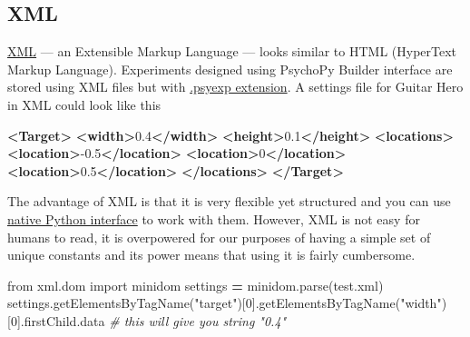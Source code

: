 \documentclass[
]{book}
\newenvironment{Shaded}{\begin{snugshade}}{\end{snugshade}}
\newcommand{\CommentTok}[1]{\textcolor[rgb]{0.56,0.35,0.01}{\textit{#1}}}
\newcommand{\DecValTok}[1]{\textcolor[rgb]{0.00,0.00,0.81}{#1}}
\newcommand{\ImportTok}[1]{#1}
\newcommand{\KeywordTok}[1]{\textcolor[rgb]{0.13,0.29,0.53}{\textbf{#1}}}
\newcommand{\NormalTok}[1]{#1}
\newcommand{\OperatorTok}[1]{\textcolor[rgb]{0.81,0.36,0.00}{\textbf{#1}}}
\newcommand{\StringTok}[1]{\textcolor[rgb]{0.31,0.60,0.02}{#1}}
\begin{document}
\hypertarget{xml}{%
\subsection{XML}\label{xml}}

\href{https://en.wikipedia.org/wiki/XML}{XML} --- an Extensible Markup Language --- looks similar to HTML (HyperText Markup Language). Experiments designed using PsychoPy Builder interface are stored using XML files but with \href{https://www.psychopy.org/psyexp.html}{.psyexp extension}. A settings file for Guitar Hero in XML could look like this

\begin{Shaded}
\begin{Highlighting}[]
\KeywordTok{\textless{}Target\textgreater{}}
  \KeywordTok{\textless{}width\textgreater{}}\NormalTok{0.4}\KeywordTok{\textless{}/width\textgreater{}}
  \KeywordTok{\textless{}height\textgreater{}}\NormalTok{0.1}\KeywordTok{\textless{}/height\textgreater{}}
  \KeywordTok{\textless{}locations\textgreater{}}
    \KeywordTok{\textless{}location\textgreater{}}\NormalTok{{-}0.5}\KeywordTok{\textless{}/location\textgreater{}}
    \KeywordTok{\textless{}location\textgreater{}}\NormalTok{0}\KeywordTok{\textless{}/location\textgreater{}}
    \KeywordTok{\textless{}location\textgreater{}}\NormalTok{0.5}\KeywordTok{\textless{}/location\textgreater{}}
  \KeywordTok{\textless{}/locations\textgreater{}}
\KeywordTok{\textless{}/Target\textgreater{}}
\end{Highlighting}
\end{Shaded}

The advantage of XML is that it is very flexible yet structured and you can use \href{https://docs.python.org/3/library/xml.html}{native Python interface} to work with them. However, XML is not easy for humans to read, it is overpowered for our purposes of having a simple set of unique constants and its power means that using it is fairly cumbersome.

\begin{Shaded}
\begin{Highlighting}[]
\ImportTok{from}\NormalTok{ xml.dom }\ImportTok{import}\NormalTok{ minidom}
\NormalTok{settings }\OperatorTok{=}\NormalTok{ minidom.parse(}\StringTok{\textquotesingle{}test.xml\textquotesingle{}}\NormalTok{)}
\NormalTok{settings.getElementsByTagName(}\StringTok{"target"}\NormalTok{)[}\DecValTok{0}\NormalTok{].getElementsByTagName(}\StringTok{"width"}\NormalTok{)[}\DecValTok{0}\NormalTok{].firstChild.data }\CommentTok{\# this will give you string "0.4"}
\end{Highlighting}
\end{Shaded}
\end{document}
